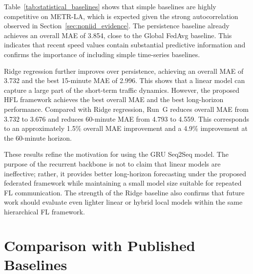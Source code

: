 Table~\ref{tab:statistical_baselines} shows that simple baselines are highly competitive on METR-LA, which is expected given the strong autocorrelation observed in Section~\ref{sec:noniid_evidence}. The persistence baseline already achieves an overall MAE of 3.854, close to the Global FedAvg baseline. This indicates that recent speed values contain substantial predictive information and confirms the importance of including simple time-series baselines.

Ridge regression further improves over persistence, achieving an overall MAE of 3.732 and the best 15-minute MAE of 2.996. This shows that a linear model can capture a large part of the short-term traffic dynamics. However, the proposed HFL framework achieves the best overall MAE and the best long-horizon performance. Compared with Ridge regression, Run~G reduces overall MAE from 3.732 to 3.676 and reduces 60-minute MAE from 4.793 to 4.559. This corresponds to an approximately 1.5\% overall MAE improvement and a 4.9\% improvement at the 60-minute horizon.

These results refine the motivation for using the GRU Seq2Seq model. The purpose of the recurrent backbone is not to claim that linear models are ineffective; rather, it provides better long-horizon forecasting under the proposed federated framework while maintaining a small model size suitable for repeated FL communication. The strength of the Ridge baseline also confirms that future work should evaluate even lighter linear or hybrid local models within the same hierarchical FL framework.

\section{Comparison with Published Baselines}
\label{sec:lit_comparison}

